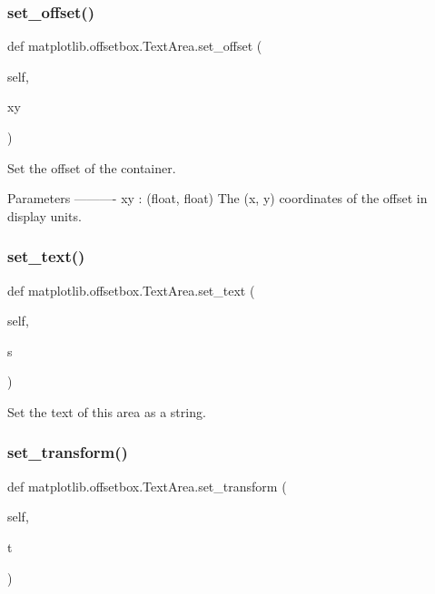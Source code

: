 \subsubsection{\texorpdfstring{set\+\_\+offset()}{set\_offset()}}
{\footnotesize\ttfamily def matplotlib.\+offsetbox.\+Text\+Area.\+set\+\_\+offset (\begin{DoxyParamCaption}\item[{}]{self,  }\item[{}]{xy }\end{DoxyParamCaption})}

\begin{DoxyVerb}Set the offset of the container.

Parameters
----------
xy : (float, float)
    The (x, y) coordinates of the offset in display units.
\end{DoxyVerb}
 \mbox{\label{classmatplotlib_1_1offsetbox_1_1TextArea_a7acb6eb3b2f2dce00c07291f4718194f}} 
\subsubsection{\texorpdfstring{set\+\_\+text()}{set\_text()}}
{\footnotesize\ttfamily def matplotlib.\+offsetbox.\+Text\+Area.\+set\+\_\+text (\begin{DoxyParamCaption}\item[{}]{self,  }\item[{}]{s }\end{DoxyParamCaption})}

\begin{DoxyVerb}Set the text of this area as a string.\end{DoxyVerb}
 \mbox{\label{classmatplotlib_1_1offsetbox_1_1TextArea_a7b92c6ccb364d2720800b92481fa6693}} 
\subsubsection{\texorpdfstring{set\+\_\+transform()}{set\_transform()}}
{\footnotesize\ttfamily def matplotlib.\+offsetbox.\+Text\+Area.\+set\+\_\+transform (\begin{DoxyParamCaption}\item[{}]{self,  }\item[{}]{t }\end{DoxyParamCaption})}

